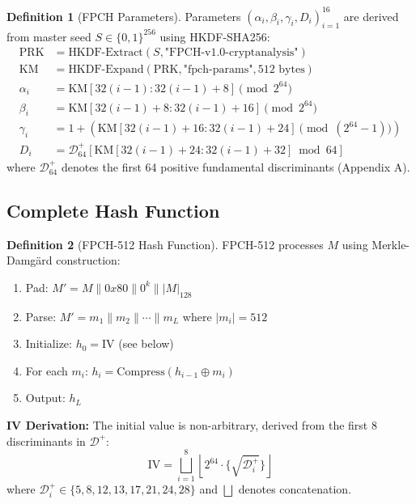 \documentclass[11pt,a4paper]{article}
\theoremstyle{plain}
\theoremstyle{definition}
\newtheorem{definition}{Definition}[section]
\theoremstyle{remark}
\begin{document}
\begin{definition}[FPCH Parameters]\label{def:params}
Parameters $(\alpha_i, \beta_i, \gamma_i, D_i)_{i=1}^{16}$ are derived from master seed $S \in \{0,1\}^{256}$ using HKDF-SHA256:
\begin{align}
\text{PRK} &= \text{HKDF-Extract}(S, \text{"FPCH-v1.0-cryptanalysis"}) \\
\text{KM} &= \text{HKDF-Expand}(\text{PRK}, \text{"fpch-params"}, 512 \text{ bytes}) \\
\alpha_i &= \text{KM}[32(i-1) : 32(i-1)+8] \pmod{2^{64}} \\
\beta_i &= \text{KM}[32(i-1)+8 : 32(i-1)+16] \pmod{2^{64}} \\
\gamma_i &= 1 + (\text{KM}[32(i-1)+16 : 32(i-1)+24] \pmod{(2^{64}-1)}) \\
D_i &= \mathcal{D}^+_{64}[\text{KM}[32(i-1)+24 : 32(i-1)+32] \bmod 64]
\end{align}
where $\mathcal{D}^+_{64}$ denotes the first 64 positive fundamental discriminants (Appendix A).
\end{definition}

\subsection{Complete Hash Function}

\begin{definition}[FPCH-512 Hash Function]\label{def:hash512}
FPCH-512 processes $M$ using Merkle-Damg\"ard construction:
\begin{enumerate}
    \item Pad: $M' = M \| 0x80 \| 0^{k} \| |M|_{128}$
    \item Parse: $M' = m_1 \| m_2 \| \cdots \| m_L$ where $|m_i| = 512$
    \item Initialize: $h_0 = \text{IV}$ (see below)
    \item For each $m_i$: $h_i = \text{Compress}(h_{i-1} \oplus m_i)$
    \item Output: $h_L$
\end{enumerate}

\textbf{IV Derivation:} The initial value is non-arbitrary, derived from the first 8 discriminants in $\mathcal{D}^+$:
\begin{equation}
\text{IV} = \bigsqcup_{i=1}^{8} \left\lfloor 2^{64} \cdot \{\sqrt{\mathcal{D}^+_i}\} \right\rfloor
\end{equation}
where $\mathcal{D}^+_i \in \{5, 8, 12, 13, 17, 21, 24, 28\}$ and $\bigsqcup$ denotes concatenation.
\end{definition}
\end{document}
